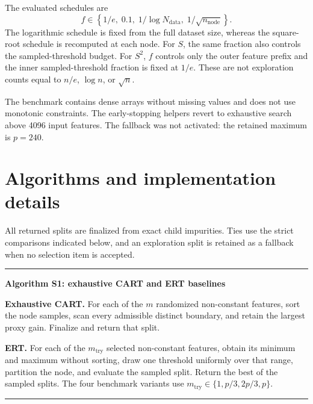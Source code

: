\documentclass[final,5p,times,twocolumn]{elsarticle}
\newenvironment{suppalgorithm}[1]{%
  \par\medskip\noindent\begin{minipage}{\columnwidth}\small
  \hrule\smallskip\textbf{#1}\par\smallskip
}{%
  \smallskip\hrule\end{minipage}\par\medskip
}
\begin{document}
The evaluated schedules are
\[
 f\in\left\{1/e,\;0.1,\;1/\log N_{\mathrm{data}},\;
 1/\sqrt{n_{\mathrm{node}}}\right\}.
\]
The logarithmic schedule is fixed from the
full dataset size, whereas the square-root schedule is recomputed at each
node.  For \(S\), the same fraction also controls the sampled-threshold budget.
For \(S^2\), \(f\) controls only the outer feature prefix and the inner
sampled-threshold fraction is fixed at \(1/e\).  These are not exploration
counts equal to \(n/e\), \(\log n\), or \(\sqrt n\).

The benchmark contains dense arrays without missing values and does not use
monotonic constraints.  The early-stopping helpers revert to exhaustive search
above 4096 input features.  The fallback was not activated: the retained
maximum is \(p=240\).

\section{Algorithms and implementation details}
\label{sec:supp_algorithms}

All returned splits are finalized from exact child impurities.  Ties use the
strict comparisons indicated below, and an exploration split is retained as a
fallback when no selection item is accepted.

\begin{suppalgorithm}{Algorithm S1: exhaustive CART and ERT baselines}
\textbf{Exhaustive CART.}
For each of the \(m\) randomized non-constant features, sort the node samples,
scan every admissible distinct boundary, and retain the largest proxy gain.
Finalize and return that split.

\smallskip
\textbf{ERT.}
For each of the \(m_{\mathrm{try}}\) selected non-constant features, obtain its
minimum and maximum without sorting, draw one threshold uniformly over that
range, partition the node, and evaluate the sampled split.  Return the best of
the sampled splits.  The four benchmark variants use
\(m_{\mathrm{try}}\in\{1,p/3,2p/3,p\}\).
\end{suppalgorithm}
\end{document}
